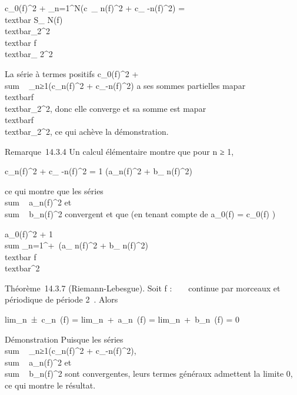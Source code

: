 \documentclass[]{article}
\begin{document}
\textbar{}c\_0(f)\textbar{}^2 +
\sum \_n=1^N(\textbar{}c~\_
n(f)\textbar{}^2 + \textbar{}c\_
-n(f)\textbar{}^2) =\\textbar{} S\_
N(f)\\textbar{}\_2^2
\leq\\textbar{} f\\textbar{}\_
2^2

La série à termes positifs
\textbar{}c\_0(f)\textbar{}^2
+ \\sum ~
\_n≥1(\textbar{}c\_n(f)\textbar{}^2 +
\textbar{}c\_-n(f)\textbar{}^2) a ses sommes
partielles ma par
\\textbar{}f\\textbar{}\_2^2,
donc elle converge et sa somme est ma par
\\textbar{}f\\textbar{}\_2^2,
ce qui achève la démonstration.

Remarque~14.3.4 Un calcul élémentaire montre que pour n ≥ 1,

\textbar{}c\_n(f)\textbar{}^2 + \textbar{}c\_
-n(f)\textbar{}^2 = 1 
(\textbar{}a\_n(f)\textbar{}^2 + \textbar{}b\_
n(f)\textbar{}^2)

ce qui montre que les séries
\\sum ~
\textbar{}a\_n(f)\textbar{}^2 et
\\sum ~
\textbar{}b\_n(f)\textbar{}^2 convergent et que (en
tenant compte de a\_0(f) = c\_0(f)
 )

 \textbar{}a\_0(f)\textbar{}^2  + 1  \\sum
\_n=1^+\infty~(\textbar{}a\_
n(f)\textbar{}^2 + \textbar{}b\_
n(f)\textbar{}^2) \leq\\textbar{}
f\\textbar{}^2

Théorème~14.3.7 (Riemann-Lebesgue). Soit f : ~ \rightarrow~  continue par morceaux
et périodique de période 2\pi~. Alors

lim\_n\rightarrow~±\infty~c\_n~(f)
= lim\_n\rightarrow~+\infty~a\_n~(f)
= lim\_n\rightarrow~+\infty~b\_n~(f) = 0

Démonstration Puisque les séries
\\sum ~
\_n≥1(\textbar{}c\_n(f)\textbar{}^2 +
\textbar{}c\_-n(f)\textbar{}^2),
\\sum ~
\textbar{}a\_n(f)\textbar{}^2 et
\\sum ~
\textbar{}b\_n(f)\textbar{}^2 sont convergentes,
leurs termes généraux admettent la limite 0, ce qui montre le résultat.
\end{document}
